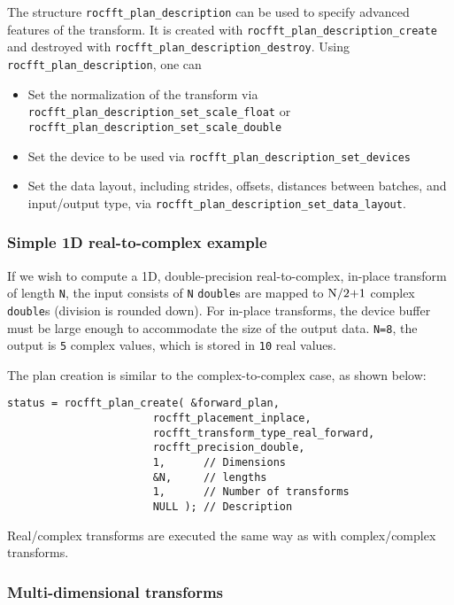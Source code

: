 \documentclass[10pt]{article}
\renewcommand{\(}{\left(}
\renewcommand{\)}{\right)}
\begin{document}
The structure \lstinline{rocfft_plan_description} can be used to
specify advanced features of the transform.  It is created with
\lstinline{rocfft_plan_description_create} and destroyed with
\lstinline{rocfft_plan_description_destroy}.  Using
\lstinline{rocfft_plan_description}, one can
\begin{itemize}
\item Set the normalization of the transform via
  \lstinline{rocfft_plan_description_set_scale_float} or
  \lstinline{rocfft_plan_description_set_scale_double}
\item Set the device to be used via
  \lstinline{rocfft_plan_description_set_devices}
\item Set the data layout, including strides, offsets, distances
  between batches, and input/output type, via
  \lstinline{rocfft_plan_description_set_data_layout}.
\end{itemize}

\subsubsection{Simple 1D real-to-complex example}
If we wish to compute a 1D, double-precision real-to-complex, in-place
transform of length \lstinline{N}, the input consists of
\lstinline{N} \lstinline{double}s are mapped to
$\text{\lstinline{N/2+1}}$ complex \lstinline{double}s (division
is rounded down).  For in-place transforms, the device buffer must be
large enough to accommodate the size of the output
data. \lstinline{N=8}, the output is \lstinline{5} complex
values, which is stored in \lstinline{10} real values.

The plan creation is similar to the complex-to-complex case, as shown
below:
\begin{lstlisting}
status = rocfft_plan_create( &forward_plan,
                       rocfft_placement_inplace,
                       rocfft_transform_type_real_forward,
                       rocfft_precision_double,
                       1,      // Dimensions
                       &N,     // lengths
                       1,      // Number of transforms
                       NULL ); // Description
\end{lstlisting}
Real/complex transforms are executed the same way as with
complex/complex transforms.

\subsubsection{Multi-dimensional transforms}
\end{document}
